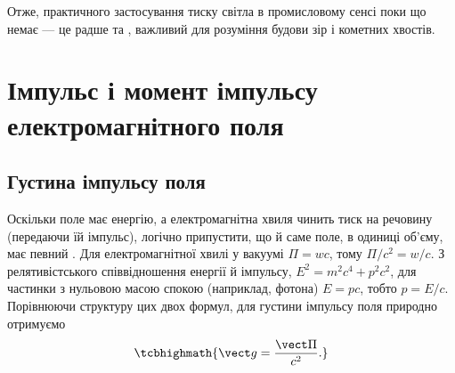 Отже, практичного застосування тиску світла в промисловому сенсі поки що немає ---
це радше  та , важливий для
розуміння будови зір і кометних хвостів.




\section{Імпульс і момент імпульсу електромагнітного поля}

\subsection*{Густина імпульсу поля}

Оскільки поле має енергію, а електромагнітна хвиля чинить тиск на речовину (передаючи їй імпульс), логічно припустити, що й саме поле, в одиниці
об'єму, має певний . Для електромагнітної хвилі у вакуумі $\Pi = wc$, тому $\Pi/c^2 = w/c$. З релятивістського співвідношення
енергії й імпульсу, $E^2 = m^2c^4+p^2c^2$, для частинки з нульовою масою спокою (наприклад, фотона) $E=pc$, тобто $p=E/c$. Порівнюючи
структуру цих двох формул, для густини імпульсу поля природно отримуємо
\begin{equation}\label{eq:MomentumDensityDef}
	\tcbhighmath{
		\vect g = \frac{\vect\Pi}{c^2}.
	}
\end{equation}

